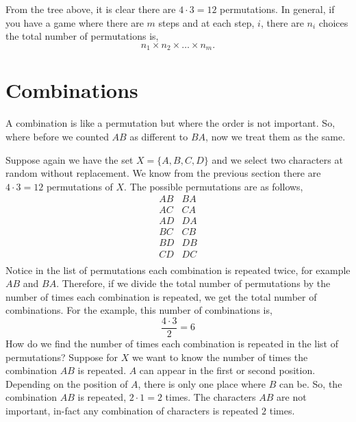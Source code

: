 \documentclass{article}
\begin{document}
From the tree above, it is clear there are $4 \cdot 3 = 12$ permutations. In general, if you have a game where there are $m$ steps and at each step, $i$, there are $n_i$ choices the total number of permutations is,
$$
    n_1 \times n_2 \times \dots \times n_m.
$$

\section{Combinations}

A combination is like a permutation but where the order is not important. So, where before we counted $AB$ as different to $BA$, now we treat them as the same.

Suppose again we have the set $X = \{ A, B, C, D \}$ and we select two characters at random without replacement. We know from the previous section there are $4 \cdot 3 = 12$ permutations of $X$. The possible permutations are as follows,
$$
\begin{matrix}
    AB & BA \\
    AC & CA \\
    AD & DA \\
    BC & CB \\
    BD & DB \\
    CD & DC \\
\end{matrix}
$$
Notice in the list of permutations each combination is repeated twice, for example $AB$ and $BA$. Therefore, if we divide the total number of permutations by the number of times each combination is repeated, we get the total number of combinations. For the example, this number of combinations is,
$$
\frac{4 \cdot 3}{2} = 6
$$
How do we find the number of times each combination is repeated in the list of permutations? Suppose for $X$ we want to know the number of times the combination $AB$ is repeated. $A$ can appear in the first or second position. Depending on the position of $A$, there is only one place where $B$ can be. So, the combination $AB$ is repeated, $2 \cdot 1 = 2$ times. The characters $AB$ are not important, in-fact any combination of characters is repeated $2$ times.
\end{document}
